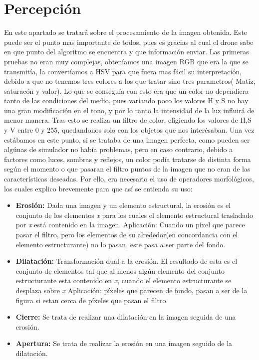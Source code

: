 \section{Percepci\'on}
\hspace{1cm} En este apartado se tratar\'a sobre el procesamiento de la imagen obtenida. Este puede ser el punto mas importante de todos, pues es gracias al cual el drone sabe en que punto del algoritmo se encuentra y que informaci\'on enviar. Las primeras pruebas no eran muy complejas, obten\'iamos una imagen RGB que era la que se transmit\'ia, la convert\'iamos a HSV para que fuera mas f\'acil su interpretaci\'on, debido a que no tenemos tres colores a los que tratar sino tres parametros( Matiz, saturac\'on y valor). Lo que se consegu\'ia con esto era que un color no dependiera tanto de las condiciones del medio, pues variando poco los valores H y S no hay una gran modificaci\'on en el tono, y por lo tanto la intensidad de la luz influir\'a de menor manera. Tras esto se realiza un filtro de color, eligiendo los valores de H,S y V entre 0 y 255, quedandonos solo con los objetos que nos inter\'esaban. Una vez est\'abamos en este punto, si se trataba de una imagen perfecta, como pueden ser alg\'unas de simulador no hab\'ia problemas, pero en caso contrario, debido a factores como luces, sombras y reflejos, un color pod\'ia tratarse de distinta forma seg\'un el momento o que pasaran el filtro puntos de la imagen que no eran de las caracter\'isticas deseadas. Por ello,  era necesario el uso de operadores morfol\'ogicos, los cuales explico brevemente para que as\'i se entienda su uso: 
\begin{itemize}
	\item \textbf{Erosi\'on:} Dada una imagen y un elemento estructural, la erosi\'on es el conjunto de los elementos \textit{x} para los cuales el elemento estructural trasladado por \textit{x} est\'a contenido en la imagen. 
	\newline\hspace{1 cm} Aplicaci\'on: Cuando un p\'ixel que parece pasar el filtro, pero los elementos de su alrededor(en concordancia con el elemento estructurante) no lo pasan, este pasa a ser parte del fondo. 
	\item \textbf{Dilataci\'on:} Transformaci\'on dual a la erosi\'on. El resultado de esta es el conjunto de elementos tal que al menos alg\'un elemento del conjunto estructurante esta contenido en \textit{x}, cuando el elemento estructurante se desplaza sobre \textit{x}
	\newline\hspace{1 cm} Aplicaci\'on: p\'ixeles que parecen de fondo, pasan a ser de la figura si estan cerca de p\'ixeles que pasan el filtro.
	\item \textbf{Cierre:} Se trata de realizar una dilataci\'on en la imagen seguida de una erosi\'on.
	\item \textbf{Apertura:} Se trata de realizar la erosi\'on en una imagen seguido de la dilataci\'on.
\end{itemize}

